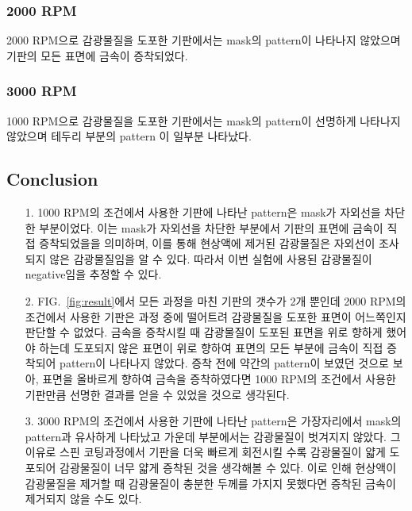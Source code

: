 \documentclass[aps,reprint,superscriptaddress,10pt]{revtex4-2}
\begin{document}
\subsubsection{2000 RPM}
  2000 RPM으로 감광물질을 도포한 기판에서는 mask의 pattern이 나타나지 않았으며
  기판의 모든 표면에 금속이 증착되었다. 
\subsubsection{3000 RPM}
  1000 RPM으로 감광물질을 도포한 기판에서는 mask의 pattern이 선명하게 나타나지 않았으며
  테두리 부분의 pattern 이 일부분 나타났다. 
\subsection{Conclusion}
\begin{itemize}
  \item[1. ] 1000 RPM의 조건에서 사용한 기판에 나타난 pattern은 mask가 자외선을 차단한
  부분이었다. 이는 mask가 자외선을 차단한 부분에서 기판의 표면에 금속이 직접 증착되었을을
  의미하며, 이를 통해 현상액에 제거된 감광물질은 자외선이 조사되지 않은 감광물질임을
  알 수 있다. 따라서 이번 실험에 사용된 감광물질이 negative임을 추정할 수 있다.



  \item[2. ] FIG.~\ref{fig:result}에서 모든 과정을 마친 기판의 갯수가 2개 뿐인데
  2000 RPM의 조건에서 사용한 기판은 과정 중에 떨어트려 감광물질을 도포한 표면이
  어느쪽인지 판단할 수 없었다. 금속을 증착시킬 때 감광물질이 도포된 표면을 위로 향하게
  했어야 하는데 도포되지 않은 표면이 위로 향하여 표면의 모든 부분에 금속이 직접 증착되어
  pattern이 나타나지 않았다. 증착 전에 약간의 pattern이 보였던 것으로 보아, 표면을
  올바르게 향하여 금속을 증착하였다면 1000 RPM의 조건에서 사용한 기판만큼 선명한 결과를
  얻을 수 있었을 것으로 생각된다.



  \item[3. ] 3000 RPM의 조건에서 사용한 기판에 나타난 pattern은 가장자리에서
  mask의 pattern과 유사하게 나타났고 가운데 부분에서는 감광물질이 벗겨지지 않았다.
  그 이유로 스핀 코팅과정에서 기판을 더욱 빠르게 회전시킬 수록 감광물질이 얇게 도포되어
  감광물질이 너무 얇게 증착된 것을 생각해볼 수 있다. 이로 인해 현상액이 감광물질을 제거할 때
  감광물질이 충분한 두께를 가지지 못했다면 증착된 금속이 제거되지 않을 수도 있다.
  

  
  
  

\end{itemize}

\nocite{*} 





\vfill
\end{document}
